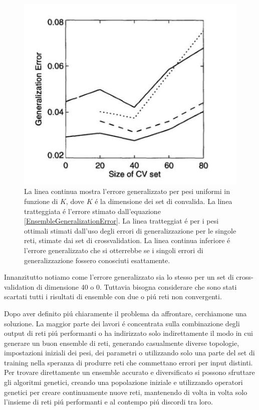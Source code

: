 \documentclass[a4paper,10pt]{article}
\begin{document}
  \begin{figure}[h!]
   \centering
   \includegraphics[scale=0.4]{GenError.png} 
   \caption{La linea continua mostra l'errore generalizzato per pesi uniformi in funzione di $K$, dove $K$ \'e la dimensione dei set di convalida. La linea tratteggiata \'e l'errore stimato dall'equazione \ref{EnsembleGeneralizationError}. La linea tratteggiat \'e per i pesi ottimali stimati dall'uso degli errori di generalizzazione per le singole reti, stimate dai set di crossvalidation. La linea continua inferiore \'e l'errore generalizzato che si otterrebbe se i singoli errori di generalizzazione fossero conosciuti esattamente.}
   \label{GenErrorpng}
  \end{figure}
  Innanzitutto notiamo come l'errore generalizzato sia lo stesso per un set di cross-validation di dimensione 40 o 0. Tuttavia bisogna considerare che sono stati scartati tutti i risultati di ensemble con due o pi\'u reti non convergenti.

  Dopo aver definito pi\'u chiaramente il problema da affrontare, cerchiamone una soluzione. La maggior parte dei lavori \'e concentrata sulla combinazione degli output di reti pi\'u performanti o ha indirizzato solo indirettamente il modo in cui generare un buon ensemble di reti, generando casualmente diverse topologie, impostazioni iniziali dei pesi, dei parametri o utilizzando solo una parte del set di training nella speranza di produrre reti che commettano errori per input distinti. Per trovare direttamente un ensemble accurato e diversificato si possono sfruttare gli algoritmi genetici, creando una popolazione iniziale e utilizzando operatori genetici per creare continuamente nuove reti, mantenendo di volta in volta solo l'insieme di reti pi\'u performanti e al contempo pi\'u discordi tra loro. 
\end{document}
